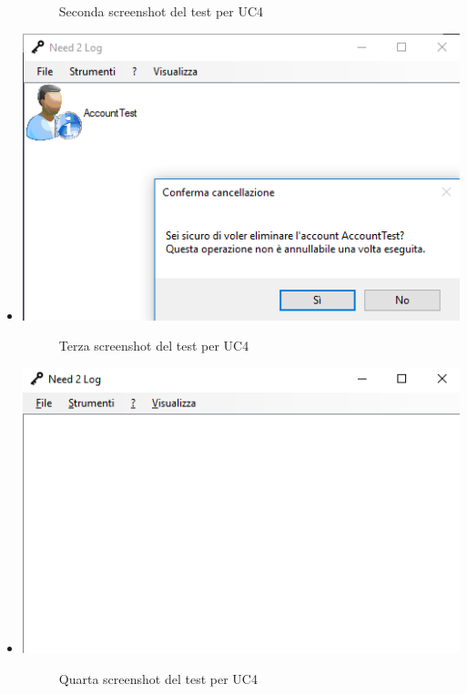 \documentclass[a4paper,10pt]{report}
\begin{document}
\begin{itemize}
{\begin{figure}[!h]
								\caption{Seconda screenshot del test per UC4}
							\end{figure}}
					\item[] {
						\begin{center}
							\includegraphics[scale=1]{immagini/test/testUC4_3.png}
							\end{center}
						\begin{figure}[!h]
								\caption{Terza screenshot del test per UC4}
							\end{figure}}
					\item[] {
						\begin{center}
							\includegraphics[scale=1]{immagini/test/testUC4_4.png}
							\end{center}
						\begin{figure}[!h]
								\caption{Quarta screenshot del test per UC4}
							\end{figure}}
					\end{itemize}
			\newpage
\end{document}
